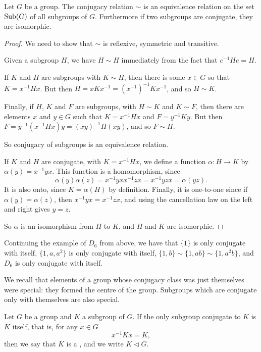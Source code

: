\begin{proposition}
  Let $G$ be a group.  The conjugacy relation $\sim$ is an equivalence relation
  on the set $\operatorname{Sub}(G)$ of all subgroups of $G$.  Furthermore if two
  subgroups are conjugate, they are isomorphic.
\end{proposition}
\begin{proof}
  We need to show that $\sim$ is reflexive, symmetric and transitive.
  
  Given a subgroup $H$, we have $H \sim H$ immediately from the fact that
  $e^{-1}He = H$.
  
  If $K$ and $H$ are subgroups with $K \sim H$, then there is some $x \in G$
  so that $K = x^{-1}Hx$.  But then $H = xKx^{-1} = (x^{-1})^{-1}Kx^{-1}$, and
  so $H \sim K$.
  
  Finally, if $H$, $K$ and $F$ are subgroups, with $H \sim K$ and $K \sim F$, 
  then there are elements $x$ and $y \in G$ such that $K = x^{-1}Hx$ and $F
  = y^{-1}Ky$.  But then $F = y^{-1}(x^{-1}Hx)y = (xy)^{-1}H(xy)$, and so
  $F \sim H$.
  
  So conjugacy of subgroups is an equivalence relation.
  
  If $K$ and $H$ are conjugate, with $K = x^{-1}Hx$, we define a function
  $\alpha : H \to K$ by $\alpha(y) = x^{-1}yx$.  This function is a
  homomorphism, since
  \[
    \alpha(y)\alpha(z) = x^{-1}yxx^{-1}zx = x^{-1}yzx = \alpha(yz).
  \]
  It is also onto, since $K = \alpha(H)$ by definition.  Finally, it is
  one-to-one since if $\alpha(y) = \alpha(z)$, then $x^{-1}yx = x^{-1}zx$,
  and using the cancellation law on the left and right gives $y = z$.
  
  So $\alpha$ is an isomorphism from $H$ to $K$, and $H$ and $K$ are
  isomorphic.
\end{proof}

\begin{example}
  Continuing the example of $D_{6}$ from above, we have that $\{1\}$ is only
  conjugate with itself, $\{1, a, a^{2}\}$ is only conjugate with itself,
  $\{1, b\} \sim \{1, ab\} \sim \{1, a^{2}b\}$, and $D_{6}$ is only
  conjugate with itself.
\end{example}

We recall that elements of a group whose conjugacy class was just themselves
were special: they formed the centre of the group.  Subgroups which are
conjugate only with themselves are also special.

\begin{definition}
  Let $G$ be a group and $K$ a subgroup of $G$.  If the only subgroup
  conjugate to $K$ is $K$ itself, that is, for any $x \in G$
  \[
    x^{-1}Kx = K,
  \]
  then we say that $K$ is a , and we
  write $K \lhd G$.
\end{definition}

